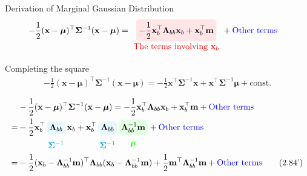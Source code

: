 \documentclass[10pt]{beamer}
\newcommand{\bluetext}[1]{\textcolor{blue}{#1}}
\newcommand{\highlightcap}[3][yellow]{\tikz[baseline=(x.base)]{\node[rectangle,rounded corners,fill=#1!10](x){$#2$} node[below of=x, node distance=2em, color=#1]{#3};}}
\begin{document}
    \begin{frame}{Derivation of Marginal Gaussian Distribution}
        \vspace*{-5mm}
        \begin{align*}
            -\frac{1}{2}(\mathbf x - \bm\mu)^\top \bm\Sigma^{-1}(\mathbf x - \bm\mu)
            &= \highlightcap[red]{\displaystyle -\frac{1}{2}\mathbf x_b^\top\bm\Lambda_{bb}\mathbf x_b + \mathbf x_b^\top \mathbf m}{The terms involving $\mathbf x_b$} + \mbox{\bluetext{Other terms}}
        \end{align*}
        \begin{block}{Completing the square}
            \begin{align*} -\frac{1}{2}(\mathbf x - \bm\mu)^\top \bm\Sigma^{-1}(\mathbf x - \bm\mu) =  -\frac{1}{2}\mathbf x^\top\bm\Sigma^{-1}\mathbf x + \mathbf x^\top\bm\Sigma^{-1}\bm\mu + \mathrm{const.} \tag{2.71}
            \end{align*}
        \end{block}\vspace{-5mm}
        \begin{align*} &-\frac{1}{2}(\mathbf x - \bm\mu)^\top \bm\Sigma^{-1}(\mathbf x - \bm\mu) = -\frac{1}{2}\mathbf x_b^\top\bm\Lambda_{bb}\mathbf x_b + \mathbf x_b^\top \mathbf m + \mbox{\bluetext{Other terms}} \\
            =& -\frac{1}{2}\mathbf x_b^\top\highlightcap[cyan]{\bm\Lambda_{bb}}{$\bm\Sigma^{-1}$}\mathbf x_b + \mathbf x_b^\top \highlightcap[cyan]{\bm\Lambda_{bb}}{$\bm\Sigma^{-1}$}\highlightcap[green]{\bm\Lambda_{bb}^{-1}\mathbf m}{$\bm\mu$} + \mbox{\bluetext{Other terms}} \\
            =& -\frac{1}{2}(\mathbf x_b - \bm\Lambda_{bb}^{-1}\mathbf m)^\top\bm\Lambda_{bb}(\mathbf x_b - \bm\Lambda_{bb}^{-1}\mathbf m)
                +\frac{1}{2}\mathbf m^\top\bm\Lambda_{bb}^{-1}\mathbf m + \mbox{\bluetext{Other terms}} \tag{2.84'}
        \end{align*}
    \end{frame}
    
\end{document}
